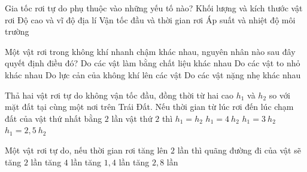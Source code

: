 \begin{ex}%
Gia tốc rơi tự do phụ thuộc vào những yếu tố nào?
\choice
{Khối lượng và kích thước vật rơi}
{\True Độ cao và vĩ độ địa lí}
{Vận tốc đầu và thời gian rơi}
{Áp suất và nhiệt độ môi trường}
\end{ex}
\begin{ex}%
Một vật rơi trong không khí nhanh chậm khác nhau, nguyên nhân nào sau đây quyết định điều đó?
\choice
{Do các vật làm bằng chất liệu khác nhau}
{Do các vật to nhỏ khác nhau}
{\True Do lực cản của không khí lên các vật}
{Do các vật nặng nhẹ khác nhau}
 \end{ex}
\begin{ex}%
Thả hai vật rơi tự do không vận tốc đầu, đồng thời từ hai cao $h_1$ và $h_2$ so với mặt đất tại cùng một nơi trên Trái Đất. Nếu thời gian từ lúc rơi đến lúc chạm đất của vật thứ nhất bằng $2$ lần vật thứ $2$ thì
\choice
{$h_1=h_2$}
{\True $h_1=4\ h_2$}
{$h_1=3\ h_2$}
{$h_1=2,5\ h_2$}

 \end{ex}
\begin{ex}%
Một vật rơi tự do, nếu thời gian rơi tăng lên $2$ lần thì quãng đường đi của vật sẽ
\choice
{tăng $2$ lần}
{\True tăng $4$ lần}
{tăng $1,4$ lần}
{tăng $2,8$ lần}

 \end{ex}

